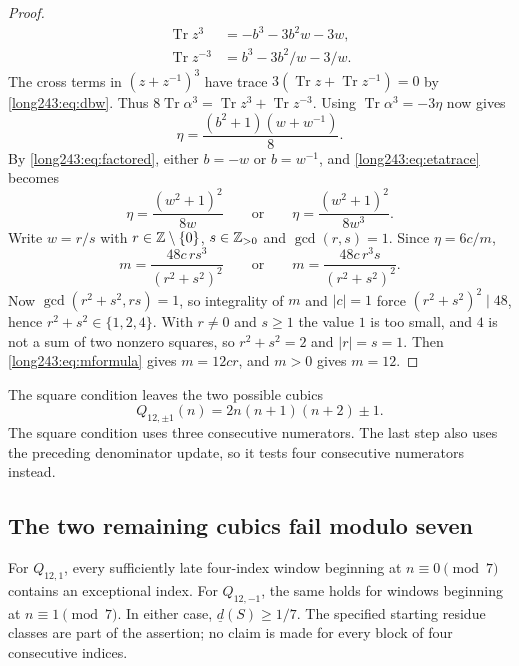 \documentclass[11pt]{article}
\DeclareMathOperator{\Tr}{Tr}
\begin{document}
\begin{proof}
\[
 \begin{aligned}
 \Tr z^3&=-b^3-3b^2w-3w,\\
 \Tr z^{-3}&=b^3-3b^2/w-3/w.
 \end{aligned}
\]
The cross terms in $(z+z^{-1})^3$ have trace
$3(\Tr z+\Tr z^{-1})=0$ by \eqref{long243:eq:dbw}.
Thus $8\Tr\alpha^3=\Tr z^3+\Tr z^{-3}$.
Using $\Tr\alpha^3=-3\eta$ now gives
\begin{equation}\label{long243:eq:etatrace}
 \eta=\frac{(b^2+1)(w+w^{-1})}8 .
\end{equation}
By \eqref{long243:eq:factored}, either $b=-w$ or $b=w^{-1}$, and \eqref{long243:eq:etatrace}
becomes
\[
 \eta=\frac{(w^2+1)^2}{8w}
 \qquad\text{or}\qquad
 \eta=\frac{(w^2+1)^2}{8w^3}.
\]
Write $w=r/s$ with $r\in\mathbb{Z}\mathbin{\backslash}\{0\}$, $s\in\mathbb{Z}_{>0}$ and $\gcd(r,s)=1$.
Since $\eta=6c/m$,
\begin{equation}\label{long243:eq:mformula}
 m=\frac{48c\,rs^3}{(r^2+s^2)^2}
 \qquad\text{or}\qquad
 m=\frac{48c\,r^3s}{(r^2+s^2)^2}.
\end{equation}
Now $\gcd(r^2+s^2,rs)=1$, so integrality of $m$ and $|c|=1$ force
$(r^2+s^2)^2\mid48$, hence $r^2+s^2\in\{1,2,4\}$.  With $r\ne0$ and $s\ge1$ the
value $1$ is too small, and $4$ is not a sum of two nonzero squares, so
$r^2+s^2=2$ and $|r|=s=1$.  Then \eqref{long243:eq:mformula} gives $m=12cr$, and
$m>0$ gives $m=12$.
\end{proof}

The square condition leaves the two possible cubics
\begin{equation}\label{long243:eq:survivors}
 Q_{12,\pm1}(n)=2n(n+1)(n+2)\pm1 .
\end{equation}
The square condition uses three consecutive numerators. The last step
also uses the preceding denominator update, so it tests four consecutive
numerators instead.

\subsection{The two remaining cubics fail modulo seven}\label{long243:sec:modseven}

\begin{lemma}\label{long243:res:modseven}
For $Q_{12,1}$, every sufficiently late four-index window beginning at
$n\equiv0\pmod7$ contains an exceptional index. For $Q_{12,-1}$, the same
holds for windows beginning at $n\equiv1\pmod7$. In either case,
$\underline d(S)\ge1/7$.
The specified starting residue classes are part of the assertion; no
claim is made for every block of four consecutive indices.
\end{lemma}
\end{document}
